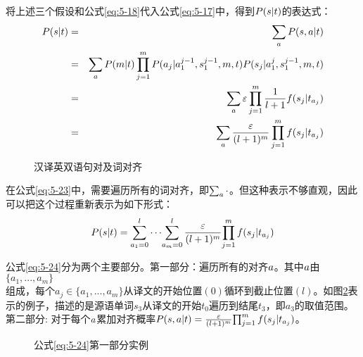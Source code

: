 \parinterval 将上述三个假设和公式\eqref{eq:5-18}代入公式\eqref{eq:5-17}中，得到${P}({s}|{t})$的表达式：
\begin{eqnarray}
{P}({s}|{t}) & = &  \sum_{{a}}{{P}({s},{a}|{t})} \nonumber \\
                        & = &  \sum_{{a}}{{P}(m|{t})}\prod_{j=1}^{m}{{P}(a_j|a_1^{j-1},s_1^{j-1},m,{t}){P}(s_j |a_1^j,s_1^{j-1},m,{t})} \nonumber \\
                        & = &  \sum_{{a}}{\varepsilon}\prod_{j=1}^{m}{\frac{1}{l+1}f(s_j|t_{a_j})} \nonumber \\
                        & = & \sum_{{a}}{\frac{\varepsilon}{(l+1)^m}}\prod_{j=1}^{m}f(s_j|t_{a_j})
\label{eq:5-23}
\end{eqnarray}

\begin{figure}[htp]
    \centering

    \caption{汉译英双语句对及词对齐}
    \label{fig:5-18}
\end{figure}

\parinterval 在公式\eqref{eq:5-23}中，需要遍历所有的词对齐，即$ \sum_{{a}}{\cdot}$。但这种表示不够直观，因此可以把这个过程重新表示为如下形式：
\begin{eqnarray}
{P}({s}|{t})={\sum_{a_1=0}^{l}\cdots}{\sum_{a_m=0}^{l}\frac{\varepsilon}{(l+1)^m}}{\prod_{j=1}^{m}f(s_j|t_{a_j})}
\label{eq:5-24}
\end{eqnarray}

\parinterval 公式\eqref{eq:5-24}分为两个主要部分。第一部分：遍历所有的对齐${a}$。其中${a}$由$\{a_1,...,a_m\}$\\ 组成，每个$a_j\in \{a_1,...,a_m\}$从译文的开始位置$(0)$循环到截止位置$(l)$。如图\ref{fig:5-19}表示的例子，描述的是源语单词$s_3$从译文的开始$t_0$遍历到结尾$t_3$，即$a_3$的取值范围。第二部分: 对于每个${a}$累加对齐概率${P}({s},a| {t})=\frac{\varepsilon}{(l+1)^m}{\prod_{j=1}^{m}f(s_j|t_{a_j})}$。

\begin{figure}[htp]
    \centering

    \caption{公式{\eqref{eq:5-24}}第一部分实例}
    \label{fig:5-19}
\end{figure}

